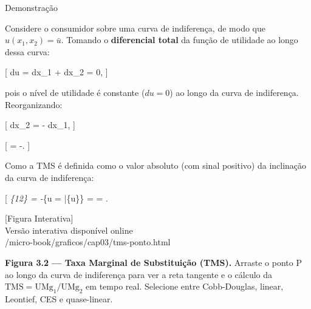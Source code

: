 \documentclass[11pt,twoside,openright]{book}
\newcommand{\figurePlaceholder}[1]{%
  \begin{center}
    \begin{tcolorbox}[
      width=0.85\textwidth,
      colback=graybg,
      colframe=gray,
      boxrule=0.5pt,
      arc=2pt,
      halign=center,
      valign=center,
      height=5cm
    ]
      \centering
      \vfill
      {\sffamily\color{gray}\large [Figura Interativa]}\\[6pt]
      {\sffamily\small\color{gray} Versão interativa disponível online}\\[4pt]
      {\ttfamily\tiny\color{gray} #1}
      \vfill
    \end{tcolorbox}
  \end{center}
}
\begin{document}
\begin{proofbox}{Demonstração}

Considere o consumidor sobre uma curva de indiferença, de modo que
\(u(x_1, x_2) = \bar{u}\). Tomando o \textbf{diferencial total} da
função de utilidade ao longo dessa curva:

{[} du =  dx\_1 +
 dx\_2 = 0, {]}

pois o nível de utilidade é constante (\(du = 0\)) ao longo da curva de
indiferença. Reorganizando:

{[}  dx\_2 =
- dx\_1, {]}

{[}  =
-. {]}

Como a TMS é definida como o valor absoluto (com sinal positivo) da
inclinação da curva de indiferença:

{[} \emph{\{12\} = -\bigg\textbar{}}\{u =
\bar\{u\}\} =
 =
. \qquad \blacksquare {]}

\end{proofbox}

\figurePlaceholder{/micro-book/graficos/cap03/tms-ponto.html}

\textbf{Figura 3.2 --- Taxa Marginal de Substituição (TMS).} Arraste o
ponto P ao longo da curva de indiferença para ver a reta tangente e o
cálculo da \(\text{TMS} = \text{UMg}_1/\text{UMg}_2\) em tempo real.
Selecione entre Cobb-Douglas, linear, Leontief, CES e quase-linear.
\end{document}
